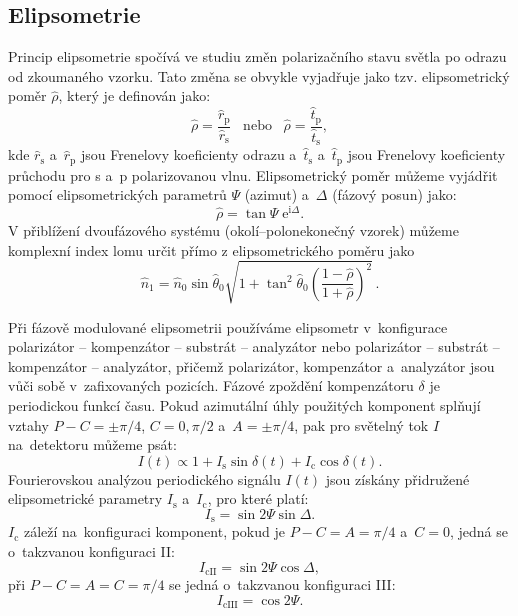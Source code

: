 \documentclass[12pt]{article}
\begin{document}
\subsection{Elipsometrie}
Princip elipsometrie spočívá ve studiu změn polarizačního stavu světla po odrazu od zkoumaného vzorku. Tato změna se obvykle vyjadřuje jako tzv. elipsometrický poměr $\hat{\rho}$, který je definován jako:
\begin{equation} \hat{\rho} = \frac{\hat{r}_\mathrm{p}}{\hat{r}_\mathrm{s}} \;\;\; \mathrm{nebo} \;\;\; \hat{\rho} = \frac{\hat{t}_\mathrm{p}}{\hat{t}_\mathrm{s}} \mathrm{,}\label{elpomer}\end{equation}
kde $\hat{r}_\mathrm{s}$ a~$\hat{r}_\mathrm{p}$ jsou Frenelovy koeficienty odrazu a~$\hat{t}_\mathrm{s}$ a~$\hat{t}_\mathrm{p}$ jsou Frenelovy koeficienty průchodu pro s a~p polarizovanou vlnu. Elipsometrický poměr můžeme vyjádřit pomocí elipsometrických parametrů $\Psi$ (azimut) a~$\Delta$ (fázový posun) jako:
%
\begin{equation} \hat{\rho} = \tan{\Psi} \; \mathrm{e}^{\mathrm{i}\Delta} \mathrm{.}\end{equation}
%
V přiblížení dvoufázového systému (okolí--polonekonečný vzorek) můžeme komplexní index lomu určit přímo z elipsometrického poměru jako
\begin{equation} \hat{n}_1 = \hat{n}_0 \sin \hat{\theta}_0 \sqrt{1 + \tan^2 \hat{\theta}_0 \left(\frac{1 - \hat{\rho}}{1 + \hat{\rho}} \right)^2  } \, \mathrm{.} \label{ellrov} \end{equation}

%
Při fázově modulované elipsometrii používáme elipsometr v~konfigurace polarizátor -- kompenzátor -- substrát -- analyzátor nebo polarizátor -- substrát -- kompenzátor -- analyzátor, přičemž polarizátor, kompenzátor a~analyzátor jsou vůči sobě v~zafixovaných pozicích. Fázové zpoždění kompenzátoru $\delta$ je periodickou funkcí času. Pokud azimutální úhly použitých komponent splňují vztahy $P - C = \pm \pi/4$, $C=0, \pi/2$ a~$A = \pm \pi/4$, pak pro světelný tok $I$ na~detektoru můžeme psát:
%
\begin{equation} I(t) \propto 1 + I_\mathrm{s} \sin{\delta(t)} + I_\mathrm{c} \cos{\delta(t)} \mathrm{.}\end{equation}
%
Fourierovskou analýzou periodického signálu $I(t)$ jsou získány přidružené elipsometrické parametry $I_\mathrm{s}$ a~$I_{\mathrm{c}}$, pro které platí:
\begin{equation} I_\mathrm{s} = \sin{2\Psi} \sin{\Delta} \mathrm{.}\end{equation}
$I_{\mathrm{c}}$ záleží na~konfiguraci komponent, pokud je $P - C = A = \pi/4$ a~$ C = 0 $, jedná se o~takzvanou konfiguraci II:
\begin{equation} I_\mathrm{cII} = \sin{2\Psi} \cos{\Delta} \mathrm{,}\end{equation} 
při $P - C = A = C = \pi/4$ se jedná o~takzvanou konfiguraci III:
\begin{equation} I_\mathrm{cIII} = \cos{2\Psi} \mathrm{.}\end{equation}
\end{document}
